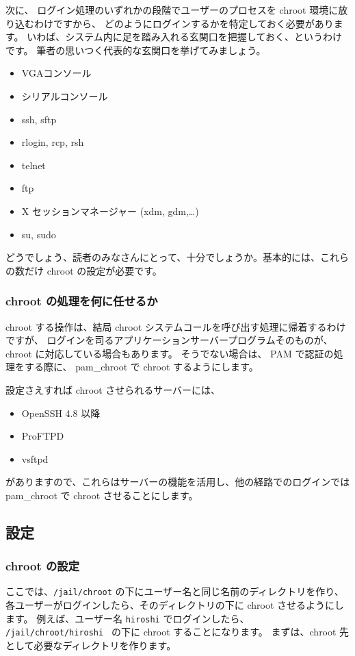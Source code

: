 次に、 ログイン処理のいずれかの段階でユーザーのプロセスを chroot 環境に放り込むわけですから、
どのようにログインするかを特定しておく必要があります。
いわば、システム内に足を踏み入れる玄関口を把握しておく、というわけです。
筆者の思いつく代表的な玄関口を挙げてみましょう。

\begin{itemize}
\item VGAコンソール
\item シリアルコンソール
\item ssh, sftp
\item rlogin, rcp, rsh
\item telnet
\item ftp
\item X セッションマネージャー (xdm, gdm,\ldots)
\item su, sudo
\end{itemize}

どうでしょう、読者のみなさんにとって、十分でしょうか。基本的には、これらの数だけ chroot の設定が必要です。

\subsubsection{chroot の処理を何に任せるか}

chroot する操作は、結局 chroot システムコールを呼び出す処理に帰着するわけですが、
ログインを司るアプリケーションサーバープログラムそのものが、 chroot に対応している場合もあります。
そうでない場合は、 PAM で認証の処理をする際に、 pam\_chroot で chroot するようにします。

設定さえすれば chroot させられるサーバーには、
\begin{itemize}
\item OpenSSH 4.8 以降
\item ProFTPD
\item vsftpd
\end{itemize}
がありますので、これらはサーバーの機能を活用し、他の経路でのログインでは pam\_chroot で chroot させることにします。

\subsection{設定}

\subsubsection{chroot の設定}

ここでは、{\tt /jail/chroot} の下にユーザー名と同じ名前のディレクトリを作り、
各ユーザーがログインしたら、そのディレクトリの下に chroot させるようにします。
例えば、ユーザー名 {\tt hiroshi} でログインしたら、 {\tt /jail/chroot/hiroshi } の下に chroot することになります。
まずは、chroot 先として必要なディレクトリを作ります。


